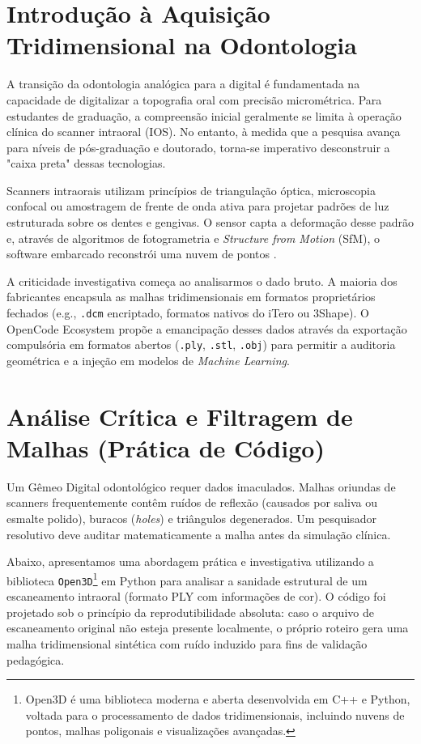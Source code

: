 
\section{Introdução à Aquisição Tridimensional na Odontologia}

A transição da odontologia analógica para a digital é fundamentada na capacidade de digitalizar a topografia oral com precisão micrométrica. Para estudantes de graduação, a compreensão inicial geralmente se limita à operação clínica do scanner intraoral (IOS). No entanto, à medida que a pesquisa avança para níveis de pós-graduação e doutorado, torna-se imperativo desconstruir a "caixa preta" dessas tecnologias.

Scanners intraorais utilizam princípios de triangulação óptica, microscopia confocal ou amostragem de frente de onda ativa para projetar padrões de luz estruturada sobre os dentes e gengivas. O sensor capta a deformação desse padrão e, através de algoritmos de fotogrametria e \textit{Structure from Motion} (SfM), o software embarcado reconstrói uma nuvem de pontos \cite{Nature2026}.

A criticidade investigativa começa ao analisarmos o dado bruto. A maioria dos fabricantes encapsula as malhas tridimensionais em formatos proprietários fechados (e.g., \texttt{.dcm} encriptado, formatos nativos do iTero ou 3Shape). O OpenCode Ecosystem propõe a emancipação desses dados através da exportação compulsória em formatos abertos (\texttt{.ply}, \texttt{.stl}, \texttt{.obj}) para permitir a auditoria geométrica e a injeção em modelos de \textit{Machine Learning}.

\section{Análise Crítica e Filtragem de Malhas (Prática de Código)}

Um Gêmeo Digital odontológico requer dados imaculados. Malhas oriundas de scanners frequentemente contêm ruídos de reflexão (causados por saliva ou esmalte polido), buracos (\textit{holes}) e triângulos degenerados. Um pesquisador resolutivo deve auditar matematicamente a malha antes da simulação clínica.

Abaixo, apresentamos uma abordagem prática e investigativa utilizando a biblioteca \texttt{Open3D}\footnote{Open3D é uma biblioteca moderna e aberta desenvolvida em C++ e Python, voltada para o processamento de dados tridimensionais, incluindo nuvens de pontos, malhas poligonais e visualizações avançadas.} em Python para analisar a sanidade estrutural de um escaneamento intraoral (formato PLY com informações de cor). O código foi projetado sob o princípio da reprodutibilidade absoluta: caso o arquivo de escaneamento original não esteja presente localmente, o próprio roteiro gera uma malha tridimensional sintética com ruído induzido para fins de validação pedagógica.


